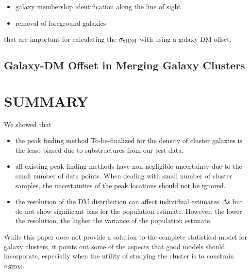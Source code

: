 \begin{itemize}
		\item galaxy membership identification along the line of sight
		\item removal of foreground galaxies  
	\end{itemize}
	that are important for calculating the $\sigma_{\rm SIDM}$ with using a
	galaxy-DM offset. 


\subsection{Galaxy-DM Offset in Merging Galaxy Clusters}

\section{SUMMARY}
We showed that 
\begin{itemize}
		\item  the peak finding method To-be-finalized for the density of cluster
			galaxies is the least biased due to substructures from our test data. 
		\item  all existing peak finding methods have non-negligible uncertainty 
			due to the small number of data points. When dealing with small number of
			cluster samples, the uncertainties of the peak locations should not be
			ignored.
		\item the resolution of the DM distribution can affect
			individual estimates $\Delta s$ but do not show significant bias for
			the population estimate. However, the lower the resolution, the higher
			the variance of the population estimate.  
\end{itemize}
While this paper does not provide a solution to the complete statistical model
for galaxy clusters, it points out some of the aspects that good models should
incorporate, especially when the utility of studying the cluster is to
constrain $\sigma_{\rm SIDM}$.

